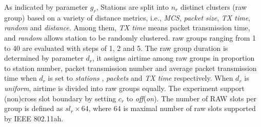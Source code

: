 As indicated by parameter $g_r$, Stations are split into $n_r$ distinct clusters (\gls{raw} group) based on a variety of distance metrics, i.e., \textit{MCS}, \textit{packet size}, \textit{TX time}, \textit{random} and \textit{distance}. Among them, \textit{TX time} means packet transmission time, and \textit{random} allows station to be randomly clustered. \gls{raw} groups ranging from 1 to 40 are evaluated with steps of 1, 2 and 5. %
The \gls{raw} group duration is determined by parameter $d_r$, it assigns airtime among \gls{raw} groups in proportion to station number, packet transmission number and average packet transmission time when $d_r$ is set to \textit{stations} , \textit{packets} and \textit{TX time} respectively. When $d_r$ is \textit{uniform}, airtime is divided into \gls{raw} groups equally. The experiment support (non)cross slot boundary by setting $c_r$ to \textit{off}(\textit{on}). The number of RAW slots per group is defined as $\textit{sl}_r \times 64$, where $64$ is maximal number of \gls{raw} slots supported by IEEE 802.11ah.










